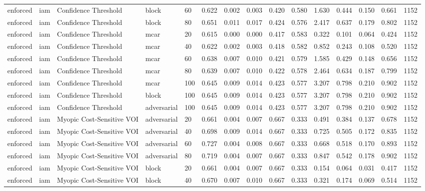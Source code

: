 \begin{table}[!ht]
{\begin{tabular}{lllllllllllllll}
enforced & iam & Confidence Threshold & block & 60 & 0.622 & 0.002 & 0.003 & 0.420 & 0.580 & 1.630 & 0.444 & 0.150 & 0.661 & 1152 \\
enforced & iam & Confidence Threshold & block & 80 & 0.651 & 0.011 & 0.017 & 0.424 & 0.576 & 2.417 & 0.637 & 0.179 & 0.802 & 1152 \\
enforced & iam & Confidence Threshold & mcar & 20 & 0.615 & 0.000 & 0.000 & 0.417 & 0.583 & 0.322 & 0.101 & 0.064 & 0.424 & 1152 \\
enforced & iam & Confidence Threshold & mcar & 40 & 0.622 & 0.002 & 0.003 & 0.418 & 0.582 & 0.852 & 0.243 & 0.108 & 0.520 & 1152 \\
enforced & iam & Confidence Threshold & mcar & 60 & 0.638 & 0.007 & 0.010 & 0.421 & 0.579 & 1.585 & 0.429 & 0.148 & 0.656 & 1152 \\
enforced & iam & Confidence Threshold & mcar & 80 & 0.639 & 0.007 & 0.010 & 0.422 & 0.578 & 2.464 & 0.634 & 0.187 & 0.799 & 1152 \\
enforced & iam & Confidence Threshold & mcar & 100 & 0.645 & 0.009 & 0.014 & 0.423 & 0.577 & 3.207 & 0.798 & 0.210 & 0.902 & 1152 \\
enforced & iam & Confidence Threshold & block & 100 & 0.645 & 0.009 & 0.014 & 0.423 & 0.577 & 3.207 & 0.798 & 0.210 & 0.902 & 1152 \\
enforced & iam & Confidence Threshold & adversarial & 100 & 0.645 & 0.009 & 0.014 & 0.423 & 0.577 & 3.207 & 0.798 & 0.210 & 0.902 & 1152 \\
enforced & iam & Myopic Cost-Sensitive VOI & adversarial & 20 & 0.661 & 0.004 & 0.007 & 0.667 & 0.333 & 0.491 & 0.384 & 0.137 & 0.678 & 1152 \\
enforced & iam & Myopic Cost-Sensitive VOI & adversarial & 40 & 0.698 & 0.009 & 0.014 & 0.667 & 0.333 & 0.725 & 0.505 & 0.172 & 0.835 & 1152 \\
enforced & iam & Myopic Cost-Sensitive VOI & adversarial & 60 & 0.727 & 0.004 & 0.008 & 0.667 & 0.333 & 0.668 & 0.518 & 0.170 & 0.893 & 1152 \\
enforced & iam & Myopic Cost-Sensitive VOI & adversarial & 80 & 0.719 & 0.004 & 0.007 & 0.667 & 0.333 & 0.847 & 0.542 & 0.178 & 0.902 & 1152 \\
enforced & iam & Myopic Cost-Sensitive VOI & block & 20 & 0.661 & 0.004 & 0.007 & 0.667 & 0.333 & 0.154 & 0.064 & 0.031 & 0.417 & 1152 \\
enforced & iam & Myopic Cost-Sensitive VOI & block & 40 & 0.670 & 0.007 & 0.010 & 0.667 & 0.333 & 0.321 & 0.174 & 0.069 & 0.514 & 1152 \\

\end{tabular}}
\end{table}
